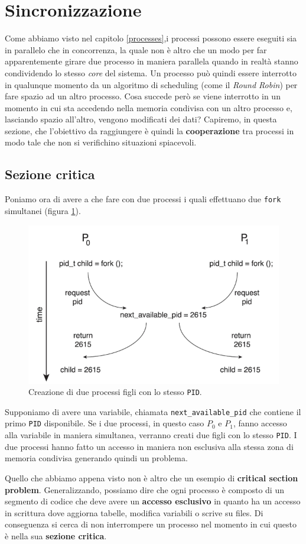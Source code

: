 \section{Sincronizzazione}\label{sincronizzazione}
Come abbiamo visto nel capitolo \ref{processes},i processi possono essere eseguiti sia in parallelo che in concorrenza, la quale non è altro che un modo per far apparentemente girare due processo in maniera parallela quando in realtà stanno condividendo lo stesso \textit{core} del sistema. Un processo può quindi essere interrotto in qualunque momento da un algoritmo di scheduling (come il \textit{Round Robin}) per fare spazio ad un altro processo. Cosa succede però se viene interrotto in un momento in cui sta accedendo nella memoria condivisa con un altro processo e, lasciando spazio all'altro, vengono modificati dei dati? Capiremo, in questa sezione, che l'obiettivo da raggiungere è quindi la \textbf{cooperazione} tra processi in modo tale che non si verifichino situazioni spiacevoli.

\subsection{Sezione critica}
Poniamo ora di avere a che fare con due processi i quali effettuano due \texttt{fork} simultanei (figura \ref{fig:sim_fork_issue}).
\begin{figure}[!h]
    \centering
    \includegraphics[width=.5\textwidth]{../res/imgs/synchronization/sim_fork_issue.png}
    \caption{Creazione di due processi figli con lo stesso \texttt{PID}.}
    \label{fig:sim_fork_issue}
\end{figure}
Supponiamo di avere una variabile, chiamata \texttt{next\_available\_pid} che contiene il primo \texttt{PID} disponibile. Se i due processi, in questo caso $P_0$ e $P_1$, fanno accesso alla variabile in maniera simultanea, verranno creati due figli con lo stesso \texttt{PID}. I due processi hanno fatto un accesso in maniera non esclusiva alla stessa zona di memoria condivisa generando quindi un problema.

Quello che abbiamo appena visto non è altro che un esempio di \textbf{critical section problem}. Generalizzando, possiamo dire che ogni processo è composto di un segmento di codice che deve avere un \textbf{accesso esclusivo} in quanto ha un accesso in scrittura dove aggiorna tabelle, modifica variabili o scrive su files. Di conseguenza si cerca di non interrompere un processo nel momento in cui questo è nella sua \textbf{sezione critica}.
% 
